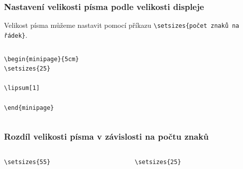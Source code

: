 \begin{frame}[fragile]
  \frametitle{Nastavení velikosti písma podle velikosti displeje}

  Velikost písma můžeme nastavit pomocí příkazu \verb|\setsizes{počet znaků na řádek}|.
  

\begin{columns}
  \begin{column}{0.5\textwidth}
\begin{verbatim}
\begin{minipage}{5cm}
\setsizes{25}

\lipsum[1]

\end{minipage}
\end{verbatim}
\end{column}
\begin{column}{0.5\textwidth}
\end{column}
\end{columns}

\end{frame}

\begin{frame}[fragile]
  \frametitle{Rozdíl velikosti písma v závislosti na počtu znaků}
\begin{columns}
  \begin{column}{0.5\textwidth}
\begin{verbatim}
\setsizes{55}
\end{verbatim}
\end{column}
\begin{column}{0.5\textwidth}
\begin{verbatim}
\setsizes{25}
\end{verbatim}
\end{column}
\end{columns}
\end{frame}

